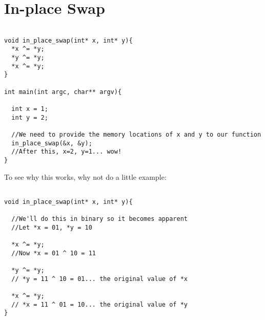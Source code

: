 \documentclass[10pt]{article}
\begin{document}
\section*{In-place Swap}


\begin{lstlisting}

void in_place_swap(int* x, int* y){
  *x ^= *y;
  *y ^= *y;
  *x ^= *y;
}

int main(int argc, char** argv){

  int x = 1;
  int y = 2;

  //We need to provide the memory locations of x and y to our function
  in_place_swap(&x, &y);
  //After this, x=2, y=1... wow!
}
\end{lstlisting}

\noindent To see why this works, why not do a little example:

\begin{lstlisting}

void in_place_swap(int* x, int* y){

  //We'll do this in binary so it becomes apparent
  //Let *x = 01, *y = 10

  *x ^= *y;
  //Now *x = 01 ^ 10 = 11

  *y ^= *y;
  // *y = 11 ^ 10 = 01... the original value of *x

  *x ^= *y;
  // *x = 11 ^ 01 = 10... the original value of *y
}

\end{lstlisting}
\end{document}
